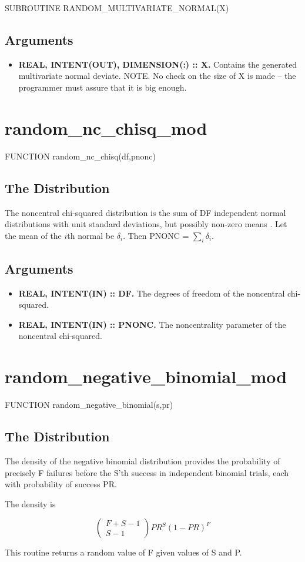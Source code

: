 \documentclass[12pt,dvips]{article}
\newcommand{\mysection}[1]{\color{blue}
            \section{#1} \normalcolor}
\newcommand{\mysubsection}[1] {\color{green}
            \subsection{#1} \normalcolor}
\newcommand{\myitem}[1]{\item{\bf \color{Violet} #1 \normalcolor}}
\begin{document}
SUBROUTINE RANDOM\_MULTIVARIATE\_NORMAL(X)

\mysubsection{Arguments}

\begin{itemize}

\myitem{REAL, INTENT(OUT), DIMENSION(:) :: X.}  Contains the generated
multivariate normal deviate.  NOTE.  No check on the size of X is made
-- the programmer must assure that it is big enough.

\end{itemize}

\pagebreak

\mysection{random\_nc\_chisq\_mod}

FUNCTION random\_nc\_chisq(df,pnonc)

\mysubsection{The Distribution}

The noncentral  chi-squared distribution is the sum  of DF independent
normal  distributions  with  unit  standard deviations,  but  possibly
non-zero  means .  Let  the mean  of the  $i$th normal  be $\delta_i$.
Then PNONC = $ \sum_i \delta_i$.

\mysubsection{Arguments}

\begin{itemize}

\myitem{REAL, INTENT(IN) :: DF.} The degrees of freedom of the
noncentral chi-squared.

\myitem{REAL, INTENT(IN) :: PNONC.} The noncentrality parameter of the
noncentral chi-squared.

\end{itemize}

\pagebreak

\mysection{random\_negative\_binomial\_mod}

FUNCTION random\_negative\_binomial(s,pr)

\mysubsection{The Distribution}

The  density  of  the  negative  binomial  distribution  provides  the
probability  of  precisely  F  failures  before the  S'th  success  in
independent binomial trials, each with probability of success PR.

The density is 

\[ \left( \begin{array}{c} F+S-1\\ S-1 \end{array} \right) PR^S (1-PR)^F \]

This routine returns a random value of F given values of S and P.
\end{document}
